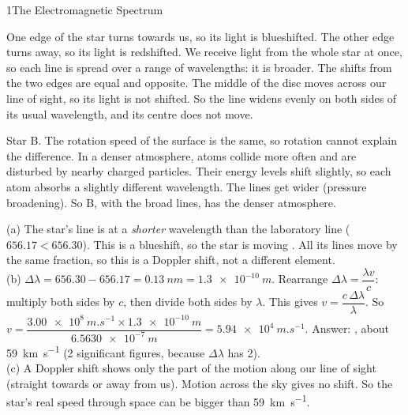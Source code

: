 \begin{chapteranswers}{1}{The Electromagnetic Spectrum}
\item One edge of the star turns towards us, so its light is blueshifted. The other edge turns
  away, so its light is redshifted. We receive light from the whole star at once, so each line
  is spread over a range of wavelengths: it is broader. The shifts from the two edges are equal
  and opposite. The middle of the disc moves across our line of sight, so its light is not
  shifted. So the line widens evenly on both sides of its usual wavelength, and its centre does
  not move.

\item Star B. The rotation speed of the surface is the same, so rotation cannot explain the
  difference. In a denser
  atmosphere, atoms collide more often and are disturbed by nearby charged particles. Their
  energy levels shift slightly, so each atom absorbs a slightly different wavelength. The lines
  get wider (pressure broadening). So B, with the broad lines, has the denser atmosphere.

\item (a) The star's line is at a \emph{shorter} wavelength than the laboratory line
  ($656.17 < 656.30$). This is a blueshift, so the star is moving . All
  its lines move by the same fraction, so this is a Doppler shift, not a different element.\\[4pt]
  (b) $\Delta\lambda = 656.30 - 656.17 = \qty{0.13}{nm} = \qty{1.3e-10}{m}$. Rearrange
  $\Delta\lambda = \dfrac{\lambda v}{c}$: multiply both sides by $c$, then divide both sides
  by $\lambda$. This gives $v = \dfrac{c\,\Delta\lambda}{\lambda}$. So
  $v = \dfrac{\qty{3.00e8}{m.s^{-1}} \times \qty{1.3e-10}{m}}{\qty{6.5630e-7}{m}}
  = \qty{5.94e4}{m.s^{-1}}$. Answer: , about
  \qty{59}{km.s^{-1}} (2 significant figures, because $\Delta\lambda$ has 2).\\[4pt]
  (c) A Doppler shift shows only the part of the motion along our line of sight (straight
  towards or away from us). Motion across the sky gives no shift. So the star's real speed
  through space can be bigger than \qty{59}{km.s^{-1}}.

\end{chapteranswers}
